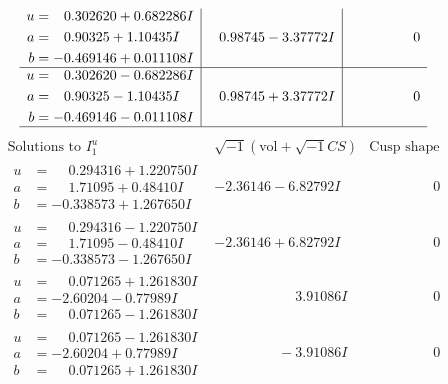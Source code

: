 \documentclass[1p]{elsarticle_modified}
\theoremstyle{definition}
\newcommand{\I}{\sqrt{-1}}
\begin{document}
$$\begin{array}{c|c|c}
\begin{aligned}
u &= \phantom{-}0.302620 + 0.682286 I \\
a &= \phantom{-}0.90325 + 1.10435 I \\
b &= -0.469146 + 0.011108 I\end{aligned}
 & \phantom{-}0.98745 - 3.37772 I & \phantom{-0.000000 } 0 \\ \hline\begin{aligned}
u &= \phantom{-}0.302620 - 0.682286 I \\
a &= \phantom{-}0.90325 - 1.10435 I \\
b &= -0.469146 - 0.011108 I\end{aligned}
 & \phantom{-}0.98745 + 3.37772 I & \phantom{-0.000000 } 0\\
 \hline 
 \end{array}$$\newpage$$\begin{array}{c|c|c}  
\text{Solutions to }I^u_{1}& \I (\text{vol} + \sqrt{-1}CS) & \text{Cusp shape}\\
 \hline 
\begin{aligned}
u &= \phantom{-}0.294316 + 1.220750 I \\
a &= \phantom{-}1.71095 + 0.48410 I \\
b &= -0.338573 + 1.267650 I\end{aligned}
 & -2.36146 - 6.82792 I & \phantom{-0.000000 } 0 \\ \hline\begin{aligned}
u &= \phantom{-}0.294316 - 1.220750 I \\
a &= \phantom{-}1.71095 - 0.48410 I \\
b &= -0.338573 - 1.267650 I\end{aligned}
 & -2.36146 + 6.82792 I & \phantom{-0.000000 } 0 \\ \hline\begin{aligned}
u &= \phantom{-}0.071265 + 1.261830 I \\
a &= -2.60204 - 0.77989 I \\
b &= \phantom{-}0.071265 - 1.261830 I\end{aligned}
 & \phantom{-0.000000 -}3.91086 I & \phantom{-0.000000 } 0 \\ \hline\begin{aligned}
u &= \phantom{-}0.071265 - 1.261830 I \\
a &= -2.60204 + 0.77989 I \\
b &= \phantom{-}0.071265 + 1.261830 I\end{aligned}
 & \phantom{-0.000000 } -3.91086 I & \phantom{-0.000000 } 0 \\ \hline\begin{aligned}

\end{aligned}
\end{array}$$
\end{document}
